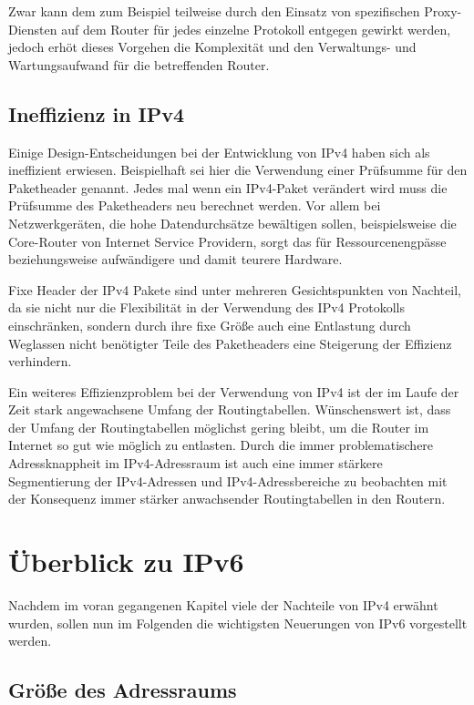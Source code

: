 \documentclass[a4paper,12pt]{scrartcl}
\begin{document}
Zwar kann dem zum Beispiel teilweise durch den Einsatz von spezifischen Proxy-Diensten auf dem Router f\"ur jedes einzelne Protokoll entgegen gewirkt werden, jedoch erh\"ot dieses Vorgehen die Komplexit\"at und den Verwaltungs- und Wartungsaufwand f\"ur die betreffenden Router.

\subsection{Ineffizienz in IPv4}
Einige Design-Entscheidungen bei der Entwicklung von IPv4 haben sich als ineffizient erwiesen. Beispielhaft sei hier die Verwendung einer Prüfsumme für den Paketheader genannt. Jedes mal wenn ein IPv4-Paket verändert wird muss die Prüfsumme des Paketheaders neu berechnet werden. Vor allem bei Netzwerkgeräten, die hohe Datendurchsätze bewältigen sollen, beispielsweise die Core-Router von Internet Service Providern, sorgt das für Ressourcenengpässe beziehungsweise aufwändigere und damit teurere Hardware.

Fixe Header der IPv4 Pakete sind unter mehreren Gesichtspunkten von Nachteil, da sie nicht nur die Flexibilität in der Verwendung des IPv4 Protokolls einschränken, sondern durch ihre fixe Größe auch eine Entlastung durch Weglassen nicht benötigter Teile des Paketheaders eine Steigerung der Effizienz verhindern.  

Ein weiteres Effizienzproblem bei der Verwendung von IPv4 ist der im Laufe der Zeit stark angewachsene Umfang der Routingtabellen. Wünschenswert ist, dass der Umfang der Routingtabellen möglichst gering bleibt, um die Router im Internet so gut wie möglich zu entlasten. Durch die immer problematischere Adressknappheit im IPv4-Adressraum ist auch eine immer stärkere Segmentierung der IPv4-Adressen und IPv4-Adressbereiche zu beobachten mit der Konsequenz immer stärker anwachsender Routingtabellen in den Routern.    



\clearpage
\section{\"Uberblick zu IPv6}
Nachdem im voran gegangenen Kapitel viele der Nachteile von IPv4 erwähnt wurden, sollen nun im Folgenden die wichtigsten Neuerungen von IPv6 vorgestellt werden. 

\subsection{Gr\"o{\ss}e  des Adressraums}
\end{document}
